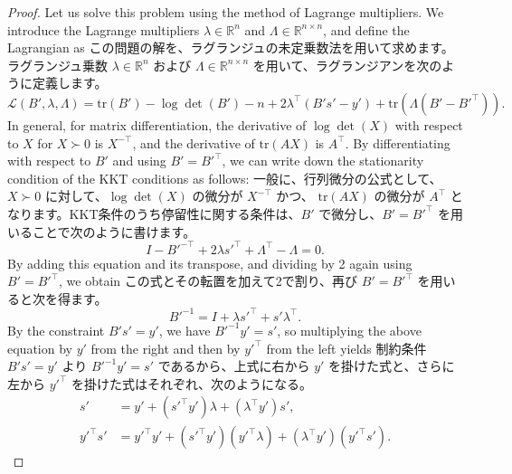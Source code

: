 \documentclass[0_main]{subfiles}
\begin{document}
\begin{proof}
    \ifEn
        Let us solve this problem using the method of Lagrange multipliers. We introduce the Lagrange multipliers $\lambda \in \mathbb{R}^n$ and $\Lambda \in \mathbb{R}^{n \times n}$, and define the Lagrangian as
    \else
        この問題の解を、ラグランジュの未定乗数法を用いて求めます。ラグランジュ乗数 $\lambda\in\mathbb{R}^n$ および $\Lambda\in\mathbb{R}^{n\times n}$ を用いて、ラグランジアンを次のように定義します。
    \fi
    \begin{equation*}
        \mathcal{L}(B',\lambda,\Lambda) = \mathrm{tr}(B') -\log\det(B') -n +2\lambda^\top(B's'-y') +\mathrm{tr}\left(\Lambda(B'-B'^\top)\right).
    \end{equation*}
    \ifEn
        In general, for matrix differentiation, the derivative of $\log\det(X)$ with respect to $X$ for $X \succ 0$ is $X^{-\top}$, and the derivative of $\mathrm{tr}(AX)$ is $A^\top$. By differentiating with respect to $B'$ and using $B' = B'^\top$, we can write down the stationarity condition of the KKT conditions as follows:
    \else
        一般に、行列微分の公式として、$X \succ 0$ に対して、$\log\det(X)$ の微分が $X^{-\top}$ かつ、 $\mathrm{tr}(AX)$ の微分が $A^\top$ となります。KKT条件のうち停留性に関する条件は、$B'$ で微分し、$B'=B'^\top$ を用いることで次のように書けます。
    \fi
    \begin{equation*}
        I-B'^{-\top}
        +2\lambda s'^\top
        +\Lambda^\top-\Lambda
        =0.
    \end{equation*}
    \ifEn
        By adding this equation and its transpose, and dividing by 2 again using $B' = B'^\top$, we obtain
    \else
        この式とその転置を加えて2で割り、再び $B' = B'^\top$ を用いると次を得ます。
    \fi
    \begin{equation*}
        B'^{-1} = I+\lambda s'^\top+s'\lambda^\top.
    \end{equation*}
    \ifEn
        By the constraint $B's' = y'$, we have $B'^{-1}y' = s'$, so multiplying the above equation by $y'$ from the right and then by $y'^\top$ from the left yields
    \else
        制約条件 $B's'=y'$ より $B'^{-1}y'=s'$ であるから、上式に右から $y'$ を掛けた式と、さらに左から $y'^\top$ を掛けた式はそれぞれ、次のようになる。
    \fi
    \begin{align*}
        s'         & = y' +(s'^\top y')\lambda +(\lambda^\top y')s',                               \\
        y'^\top s' & = y'^\top y' + (s'^\top y')(y'^\top \lambda) + (\lambda^\top y')(y'^\top s').
    \end{align*}

\end{proof}
\end{document}
